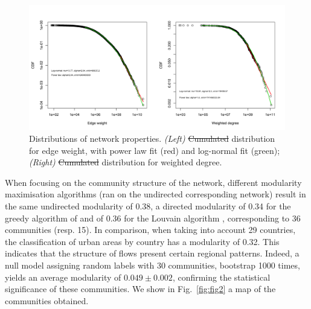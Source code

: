 \documentclass[10pt,letterpaper]{article}
\providecommand{\DIFadd}[1]{{\protect\color{blue}\uwave{#1}}} %
\providecommand{\DIFdel}[1]{{\protect\color{red}\sout{#1}}}                      %
\providecommand{\DIFaddFL}[1]{\DIFadd{#1}} %
\providecommand{\DIFdelFL}[1]{\DIFdel{#1}} %
\providecommand{\DIFaddbeginFL}{} %
\providecommand{\DIFaddendFL}{} %
\providecommand{\DIFdelbeginFL}{} %
\providecommand{\DIFdelendFL}{} %
\begin{document}
\begin{figure}
    \DIFaddbeginFL \begin{center}
        \includegraphics[width=\linewidth]{figures/Fig1.png}
    \end{center}
    \DIFaddendFL \vspace{2cm}
    \caption{Distributions of network properties. \textit{(Left)} \DIFdelbeginFL \DIFdelFL{Cumulated }\DIFdelendFL \DIFaddbeginFL \DIFaddFL{Cumulative }\DIFaddendFL distribution for edge weight, with power law fit (red) and log-normal fit (green); \textit{(Right)} \DIFdelbeginFL \DIFdelFL{Cumulated }\DIFdelendFL \DIFaddbeginFL \DIFaddFL{Cumulative }\DIFaddendFL distribution for weighted degree.}
    \label{fig:nwdist}
\end{figure}


When focusing on the community structure of the network, different modularity maximisation algorithms (ran on the undirected corresponding network) result in the same undirected modularity of 0.38, a directed modularity \cite{nicosia2009extending} of 0.34 for the greedy algorithm of \cite{clauset2004finding} and of 0.36 for the Louvain algorithm \cite{blondel2008fast}, corresponding to 36 communities (resp. 15). In comparison, when taking into account 29 countries, the classification of urban areas by country has a modularity of 0.32. This indicates that the structure of flows present certain regional patterns. Indeed, a null model assigning random labels with 30 communities, bootstrap 1000 times, yields an average modularity of $0.049 \pm 0.002$, confirming the statistical significance of these communities. We show in Fig.~\ref{fig:fig2} a map of the communities obtained.
\end{document}
